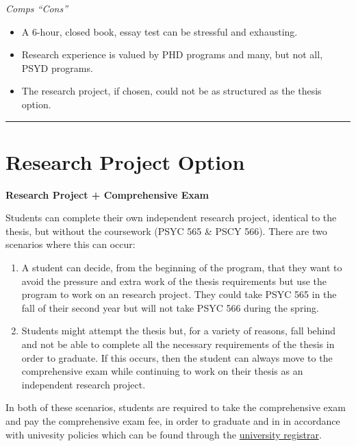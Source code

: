 \documentclass[openany]{book}
\providecommand{\tightlist}{%
  \setlength{\itemsep}{0pt}\setlength{\parskip}{0pt}}
\begin{document}
\emph{Comps ``Cons''}

\begin{itemize}
\tightlist
\item
  A 6-hour, closed book, essay test can be stressful and exhausting.
\item
  Research experience is valued by PHD programs and many, but not all, PSYD programs.
\item
  The research project, if chosen, could not be as structured as the thesis option.
\end{itemize}

\begin{center}\rule{0.5\linewidth}{0.5pt}\end{center}

\hypertarget{research-project-option}{%
\section{Research Project Option}\label{research-project-option}}

\textbf{Research Project + Comprehensive Exam}

Students can complete their own independent research project, identical to the thesis, but without the coursework (PSYC 565 \& PSCY 566). There are two scenarios where this can occur:

\begin{enumerate}
\def\labelenumi{\arabic{enumi}.}
\item
  A student can decide, from the beginning of the program, that they want to avoid the pressure and extra work of the thesis requirements but use the program to work on an research project. They could take PSYC 565 in the fall of their second year but will not take PSYC 566 during the spring.
\item
  Students might attempt the thesis but, for a variety of reasons, fall behind and not be able to complete all the necessary requirements of the thesis in order to graduate. If this occurs, then the student can always move to the comprehensive exam while continuing to work on their thesis as an independent research project.
\end{enumerate}

In both of these scenarios, students are required to take the comprehensive exam and pay the comprehensive exam fee, in order to graduate and in in accordance with univesity policies which can be found through the \href{https://www.callutheran.edu/students/registrar/}{university registrar}.
\end{document}

